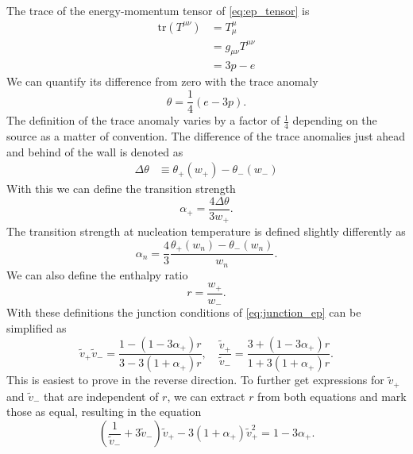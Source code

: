 The trace of the energy-momentum tensor of \eqref{eq:ep_tensor} is
\begin{align}
\text{tr} (T^{\mu \nu})
&= T^\mu_\mu \\
&= g_{\mu \nu} T^{\mu \nu} \\
&=3p - e
\end{align}
We can quantify its difference from zero with the trace anomaly
\cites[eq. 7.24]{lecture_notes}[eq. 28]{giese_2020}
\begin{equation}
\theta = \frac{1}{4}(e-3p).
\label{eq:theta}
\end{equation}
The definition of the trace anomaly varies by a factor of $\frac{1}{4}$ depending on the source as a matter of convention.
The difference of the trace anomalies just ahead and behind of the wall is denoted as
\begin{align}
\Delta \theta
&\equiv \theta_+(w_+) - \theta_-(w_-) %
\end{align}
With this we can define the transition strength
\begin{equation}
\alpha_+ = \frac{4 \Delta \theta}{3 w_+}.
\label{eq:alpha_plus}
\end{equation}
The transition strength at nucleation temperature is defined slightly differently as
\cite[eq. 2.11]{hindmarsh_gw_pt_2019}
\begin{equation}
\alpha_n = \frac{4}{3} \frac{\theta_+(w_n) - \theta_-(w_n)}{w_n}.
\label{eq:alpha_n}
\end{equation}
We can also define the enthalpy ratio
\begin{equation}
r = \frac{w_+}{w_-}.
\end{equation}
With these definitions the junction conditions of \eqref{eq:junction_ep} can be simplified as
\begin{equation}
\tilde{v}_+ \tilde{v}_- = \frac{1-(1-3\alpha_+)r}{3-3(1+\alpha_+)r},
\quad
\frac{\tilde{v}_+}{\tilde{v}_-} = \frac{3+(1-3\alpha_+)r}{1+3(1+\alpha_+)r}.
\end{equation}
This is easiest to prove in the reverse direction.
To further get expressions for $\tilde{v}_+$ and $\tilde{v}_-$ that are independent of $r$, we can extract $r$ from both equations and mark those as equal, resulting in the equation
\begin{equation}
\left( \frac{1}{\tilde{v}_-} + 3 \tilde{v}_- \right) \tilde{v}_+ - 3(1+\alpha_+)\tilde{v}_+^2 = 1 - 3\alpha_+.
\end{equation}
